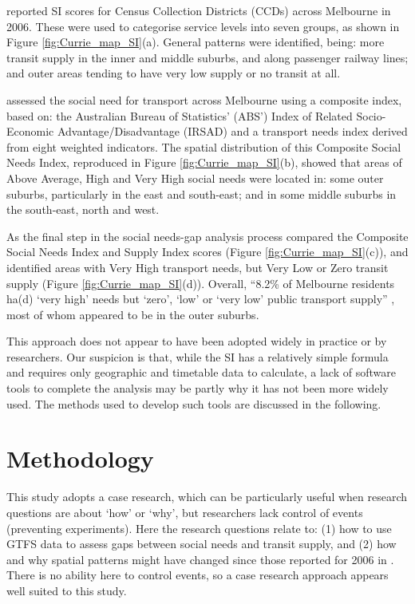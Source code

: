 \documentclass[preprint, 3p,
authoryear]{elsarticle} %
\begin{document}
\citet{currie2010identifying} reported SI scores for Census Collection
Districts (CCDs) across Melbourne in 2006. These were used to categorise
service levels into seven groups, as shown in Figure
\ref{fig:Currie_map_SI}(a). General patterns were identified, being:
more transit supply in the inner and middle suburbs, and along passenger
railway lines; and outer areas tending to have very low supply or no
transit at all.

\citet{currie2010identifying} assessed the social need for transport
across Melbourne using a composite index, based on: the Australian
Bureau of Statistics' (ABS') Index of Related Socio-Economic
Advantage/Disadvantage (IRSAD) and a transport needs index derived from
eight weighted indicators. The spatial distribution of this Composite
Social Needs Index, reproduced in Figure \ref{fig:Currie_map_SI}(b),
showed that areas of Above Average, High and Very High social needs were
located in: some outer suburbs, particularly in the east and south-east;
and in some middle suburbs in the south-east, north and west.

As the final step in the social needs-gap analysis process
\citet{currie2010identifying} compared the Composite Social Needs Index
and Supply Index scores (Figure \ref{fig:Currie_map_SI}(c)), and
identified areas with Very High transport needs, but Very Low or Zero
transit supply (Figure \ref{fig:Currie_map_SI}(d)). Overall, ``8.2\% of
Melbourne residents ha(d) `very high' needs but `zero', `low' or `very
low' public transport supply'' \citep{currie2010identifying}, most of
whom appeared to be in the outer suburbs.

This approach does not appear to have been adopted widely in practice or
by researchers. Our suspicion is that, while the SI has a relatively
simple formula and requires only geographic and timetable data to
calculate, a lack of software tools to complete the analysis may be
partly why it has not been more widely used. The methods used to develop
such tools are discussed in the following.

\section{Methodology}\label{methodology}

This study adopts a case research, which can be particularly useful when
research questions are about `how' or `why', but researchers lack
control of events (preventing experiments)\citep{Yin2009aa}. Here the
research questions relate to: (1) how to use GTFS data to assess gaps
between social needs and transit supply, and (2) how and why spatial
patterns might have changed since those reported for 2006 in
\citet{currie2010identifying}. There is no ability here to control
events, so a case research approach appears well suited to this study.
\end{document}
